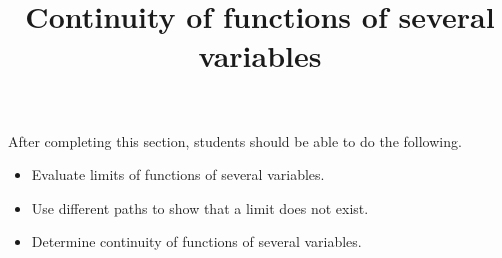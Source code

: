 \documentclass{ximera}
\title{Continuity of functions of several variables}
\begin{document}
\begin{abstract}
\end{abstract}

\maketitle

\begin{sectionOutcomes}

After completing this section, students should be able to do the following.

\begin{itemize}
\item Evaluate limits of functions of several variables.
\item Use different paths to show that a limit does not exist.
\item Determine continuity of functions of several variables. 
\end{itemize}

\end{sectionOutcomes}
\end{document}
